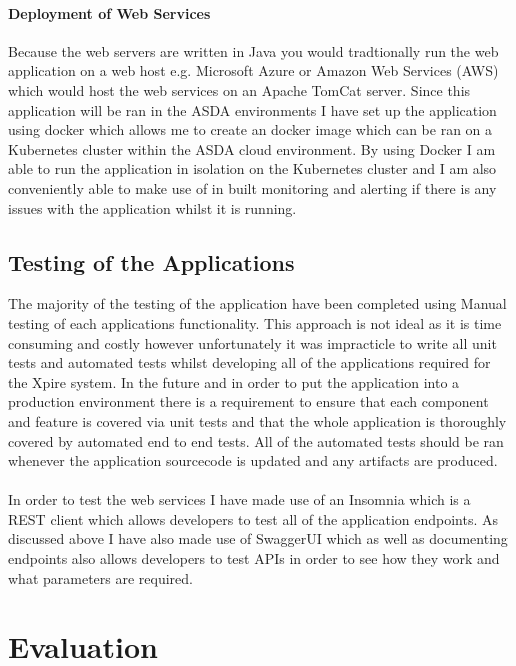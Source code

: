 \documentclass[a4paper,11pt]{report}
\begin{document}
\subsubsection{Deployment of Web Services}
Because the web servers are written in Java you would tradtionally run the web application on a web host e.g. Microsoft Azure or Amazon Web Services (AWS) which would host the web services on an Apache TomCat server. Since this application will be ran in the ASDA environments I have set up the application using docker which allows me to create an docker image which can be ran on a Kubernetes cluster within the ASDA cloud environment. 
By using Docker I am able to run the application in isolation on the Kubernetes cluster and I am also conveniently able to make use of in built monitoring and alerting if there is any issues with the application whilst it is running. 


\section{Testing of the Applications}
The majority of the testing of the application have been completed using Manual testing of each applications functionality. This approach is not ideal as it is time consuming and costly however unfortunately it was impracticle to write all unit tests and automated tests whilst developing all of the applications required for the Xpire system. In the future and in order to put the application into a production environment there is a requirement to ensure that each component and feature is covered via unit tests and that the whole application is thoroughly covered by automated end to end tests. 
All of the automated tests should be ran whenever the application sourcecode is updated and any artifacts are produced.
\\
\\
In order to test the web services I have made use of an Insomnia\cite{insomnia} which is a REST client which allows developers to test all of the application endpoints. As discussed above I have also made use of SwaggerUI which as well as documenting endpoints also allows developers to test APIs in order to see how they work and what parameters are required. 

\chapter{Evaluation}
\end{document}
